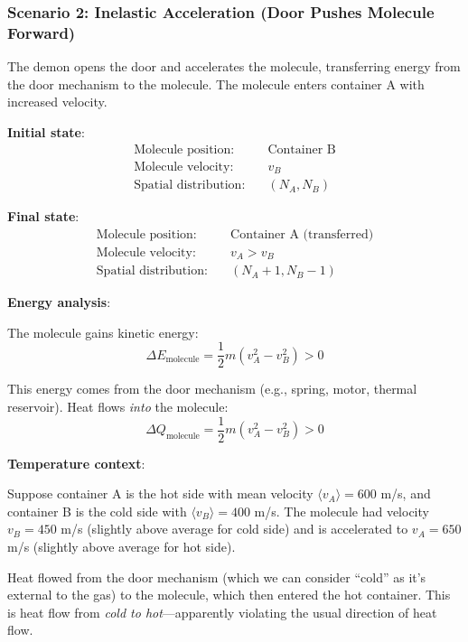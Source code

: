 \documentclass[10pt,twocolumn,letterpaper]{article}
\theoremstyle{definition}
\theoremstyle{remark}
\begin{document}
\subsubsection{Scenario 2: Inelastic Acceleration (Door Pushes Molecule Forward)}

The demon opens the door and accelerates the molecule, transferring energy from the door mechanism to the molecule. The molecule enters container A with increased velocity.

\textbf{Initial state}:
\begin{align}
\text{Molecule position:} &\quad \text{Container B} \\
\text{Molecule velocity:} &\quad v_B \\
\text{Spatial distribution:} &\quad (N_A, N_B)
\end{align}

\textbf{Final state}:
\begin{align}
\text{Molecule position:} &\quad \text{Container A (transferred)} \\
\text{Molecule velocity:} &\quad v_A > v_B \\
\text{Spatial distribution:} &\quad (N_A + 1, N_B - 1)
\end{align}

\textbf{Energy analysis}:

The molecule gains kinetic energy:
\begin{equation}
\Delta E_{\text{molecule}} = \frac{1}{2}m(v_A^2 - v_B^2) > 0
\end{equation}

This energy comes from the door mechanism (e.g., spring, motor, thermal reservoir). Heat flows \textit{into} the molecule:
\begin{equation}
\Delta Q_{\text{molecule}} = \frac{1}{2}m(v_A^2 - v_B^2) > 0
\end{equation}

\textbf{Temperature context}:

Suppose container A is the hot side with mean velocity $\langle v_A \rangle = 600$ m/s, and container B is the cold side with $\langle v_B \rangle = 400$ m/s. The molecule had velocity $v_B = 450$ m/s (slightly above average for cold side) and is accelerated to $v_A = 650$ m/s (slightly above average for hot side).

Heat flowed from the door mechanism (which we can consider ``cold'' as it's external to the gas) to the molecule, which then entered the hot container. This is heat flow from \textit{cold to hot}—apparently violating the usual direction of heat flow.
\end{document}
